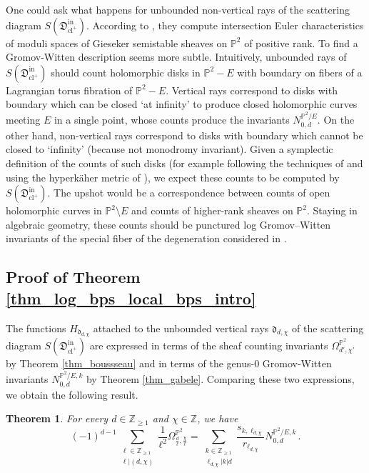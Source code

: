 \documentclass[11pt,letterpaper]{amsart}
\newtheorem{thm}[defn]{Theorem}
\newcommand\PP{\mathbb P}
\newcommand\Z{\mathbb Z}
\newcommand\fd{\mathfrak d}
\newcommand\fD{\mathfrak D}
\newcommand\cl{\operatorname{cl}}
\newcommand\iin{\mathrm{in}}
\begin{document}
One could ask what happens for unbounded non-vertical rays of the scattering diagram $S(\fD^\iin_{\cl^+})$. According to \cite{bousseau2019scattering}, they compute intersection Euler characteristics of moduli spaces of Gieseker semistable sheaves on $\PP^2$ of positive rank. To find a Gromov-Witten description seems more subtle. Intuitively, unbounded rays of $S(\fD^\iin_{\cl^+})$ should count holomorphic disks in $\PP^2-E$ with boundary on fibers of a Lagrangian torus fibration of 
$\PP^2-E$. Vertical rays correspond to disks with boundary which can be closed  `at infinity' to produce closed holomorphic curves meeting $E$ in a single point, whose counts produce the invariants $N_{0,d}^{\PP^2/E}$. On the other hand, non-vertical rays correspond to disks with boundary which cannot be closed to `infinity' (because not monodromy invariant).
Given a symplectic definition of the counts of such disks (for example following the techniques of \cite{lin2017correspondence,
lin2019correspondence} and using the hyperkäher metric of \cite{collins2019special}), we expect these counts to be computed by $S(\fD^\iin_{\cl^+})$.
The upshot would be a correspondence between counts of open holomorphic curves in 
$\PP^2 \setminus E$ and counts of higher-rank sheaves on $\PP^2$. Staying in algebraic geometry, these counts should be punctured log Gromov--Witten invariants \cite{abramovich2020punctured}
of the special fiber of the degeneration considered in \cite{gabele2019tropical}.

\subsection{Proof of Theorem \ref{thm_log_bps_local_bps_intro}}
\label{section_proof_thm_log_bps_local_bps}

The functions $H_{\fd_{d,\chi}}$ attached to the unbounded vertical rays
$\fd_{d,\chi}$ of the scattering diagram  $S(\fD^\iin_{\cl^+})$ are expressed in terms of the sheaf counting invariants $\Omega_{d',\chi'}^{\PP^2}$ by Theorem 
\ref{thm_boussseau} and in terms of the genus-$0$ Gromov-Witten invariants 
$N_{0,d}^{\PP^2/E,k}$ by Theorem \ref{thm_gabele}. Comparing these two expressions, we obtain the following result.

\begin{thm} \label{thm_sheaf_gw}
For every $d \in \Z_{\geqslant 1}$ and $\chi \in \Z$, we have 
\[ (-1)^{d-1}
 \sum_{\substack{\ell \in \Z_{\geqslant 1} \\\ell|(d,\chi)}}
\frac{1}{\ell^2} \Omega_{\frac{d}{\ell},\frac{\chi}{\ell}}^{\PP^2}
=
 \sum_{\substack{k \in \Z_{\geqslant 1} \\ \ell_{d,\chi}|k|d}}
\frac{s_{k,\ell_{d,\chi}}}{r_{\ell_{d,\chi}}} N_{0,d}^{\PP^2/E,k} \,.\]
\end{thm}
\end{document}
